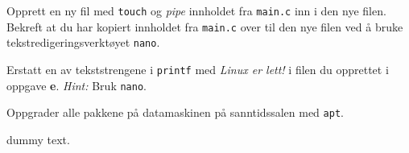 \begin{subprob}
    Opprett en ny fil med \verb|touch| og \textit{pipe} innholdet fra \verb|main.c| inn i den nye filen. Bekreft at du har kopiert innholdet fra \verb|main.c| over til den nye filen ved å bruke tekstredigeringsverktøyet \verb|nano|.
\end{subprob}

\begin{subprob}
    Erstatt en av tekststrengene i \verb|printf| med \textit{Linux er lett!} i filen du opprettet i oppgave \textbf{e}. \textit{Hint:} Bruk \verb|nano|.
\end{subprob}

\begin{subprob}
    Oppgrader alle pakkene på datamaskinen på sanntidssalen med \verb|apt|.
	\begin{solution}
	    dummy text. 
	\end{solution}
\end{subprob}


